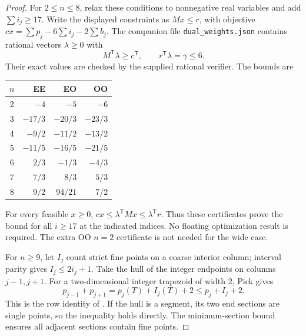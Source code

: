 \documentclass[11pt]{article}
\begin{document}
\begin{proof}
For \(2\le n\le8\), relax these conditions to nonnegative real variables and
add \(\sum i_j\ge17\). Write the displayed constraints as \(Mx\le r\), with
objective \(c x=\sum p_j-6\sum i_j-2\sum b_j\).
The companion file \texttt{dual\_weights.json} contains rational vectors
\(\lambda\ge0\) with
\[
 M^{\mathsf T}\lambda\ge c^{\mathsf T},\qquad
 r^{\mathsf T}\lambda=\gamma\le6.
\]
Their exact values are checked by the supplied rational verifier. The bounds are
\begin{center}
\begin{tabular}{c r r r}
\toprule
\(n\)&EE&EO&OO\\ \midrule
2&\(-4\)&\(-5\)&\(-6\)\\
3&\(-17/3\)&\(-20/3\)&\(-23/3\)\\
4&\(-9/2\)&\(-11/2\)&\(-13/2\)\\
5&\(-11/5\)&\(-16/5\)&\(-21/5\)\\
6&\(2/3\)&\(-1/3\)&\(-4/3\)\\
7&\(7/3\)&\(8/3\)&\(5/3\)\\
8&\(9/2\)&\(94/21\)&\(7/2\)\\ \bottomrule
\end{tabular}
\end{center}
For every feasible \(x\ge0\),
\(cx\le\lambda^{\mathsf T}Mx\le\lambda^{\mathsf T}r\).
Thus these certificates prove the bound for all \(i\ge17\) at the indicated
indices. No floating optimization result is required. The extra OO
\(n=2\) certificate is not needed for the wide case.

For \(n\ge9\), let \(I_j\) count strict fine points on a coarse interior
column; interval parity gives \(I_j\le2i_j+1\).
Take the hull of the integer endpoints on columns \(j-1,j+1\).
For a two-dimensional integer trapezoid of width 2, Pick gives
\[
 p_{j-1}+p_{j+1}=p_j(T)+I_j(T)+2\le p_j+I_j+2.
\]
This is the row identity of \cite[Lemma 6.5]{HHK}.
If the hull is a segment, its two end sections are single points, so the
inequality holds directly. The minimum-section bound ensures all adjacent
sections contain fine points.


\end{proof}
\end{document}

